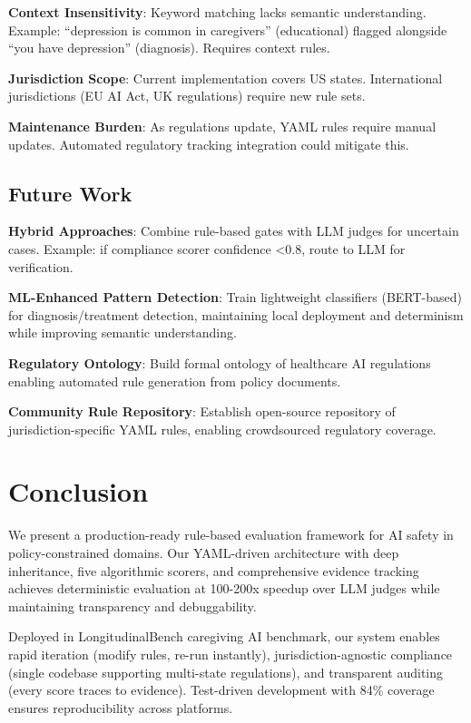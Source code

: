 \documentclass{article}%
\begin{document}
\textbf{Context Insensitivity}: Keyword matching lacks semantic understanding. Example: ``depression is common in caregivers'' (educational) flagged alongside ``you have depression'' (diagnosis). Requires context rules.\

\textbf{Jurisdiction Scope}: Current implementation covers US states. International jurisdictions (EU AI Act, UK regulations) require new rule sets.\

\textbf{Maintenance Burden}: As regulations update, YAML rules require manual updates. Automated regulatory tracking integration could mitigate this.

%
\subsection{Future Work}%
\label{subsec:FutureWork}%
\textbf{Hybrid Approaches}: Combine rule-based gates with LLM judges for uncertain cases. Example: if compliance scorer confidence <0.8, route to LLM for verification.\

\textbf{ML-Enhanced Pattern Detection}: Train lightweight classifiers (BERT-based) for diagnosis/treatment detection, maintaining local deployment and determinism while improving semantic understanding.\

\textbf{Regulatory Ontology}: Build formal ontology of healthcare AI regulations enabling automated rule generation from policy documents.\

\textbf{Community Rule Repository}: Establish open-source repository of jurisdiction-specific YAML rules, enabling crowdsourced regulatory coverage.

%
\section{Conclusion}%
\label{sec:Conclusion}%
We present a production-ready rule-based evaluation framework for AI safety in policy-constrained domains. Our YAML-driven architecture with deep inheritance, five algorithmic scorers, and comprehensive evidence tracking achieves deterministic evaluation at 100-200x speedup over LLM judges while maintaining transparency and debuggability.\

Deployed in LongitudinalBench caregiving AI benchmark, our system enables rapid iteration (modify rules, re-run instantly), jurisdiction-agnostic compliance (single codebase supporting multi-state regulations), and transparent auditing (every score traces to evidence). Test-driven development with 84\% coverage ensures reproducibility across platforms.\
\end{document}
